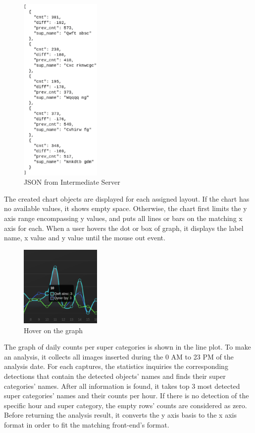 \documentclass[conference]{IEEEtran}
\begin{document}
\begin{figure}[h]
    \centering
    \includegraphics[width=0.35\textwidth]{images/dashboard_response_json.eps}
    \caption{JSON from Intermediate Server}
\end{figure}

The created chart objects are displayed for each assigned layout. If the chart has no available values, it shows empty space. Otherwise, the chart first limits the y axis range encompassing y values, and puts all lines or bars on the matching x axis for each. When a user hovers the dot or box of graph, it displays the label name, x value and y value until the mouse out event.\\

\begin{figure}[h]
    \centering
    \includegraphics[width=0.35\textwidth]{images/dashboard_hover.eps}
    \caption{Hover on the graph}
\end{figure}

The graph of daily counts per super categories is shown in the line plot. To make an analysis, it collects all images inserted during the 0 AM to 23 PM of the analysis date. For each captures, the statistics inquiries the corresponding detections that contain the detected objects' names and finds their super categories' names. After all information is found, it takes top 3 most detected super categories' names and their counts per hour. If there is no detection of the specific hour and super category, the empty rows' counts are considered as zero. Before returning the analysis result, it converts the y axis basis to the x axis format in order to fit the matching front-end's format.\\
\end{document}
